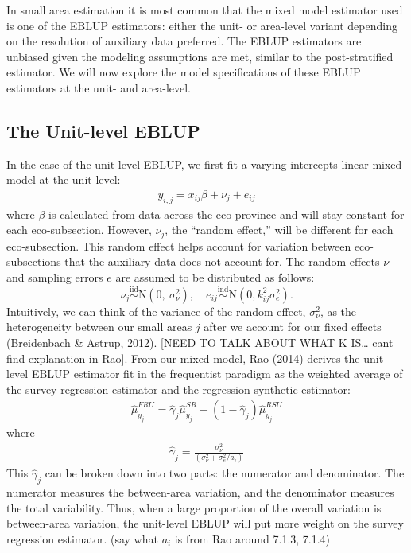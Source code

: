 \documentclass[12pt,twoside]{reedthesis}
\begin{document}
In small area estimation it is most common that the mixed model estimator used is one of the EBLUP estimators: either the unit- or area-level variant depending on the resolution of auxiliary data preferred. The EBLUP estimators are unbiased given the modeling assumptions are met, similar to the post-stratified estimator. We will now explore the model specifications of these EBLUP estimators at the unit- and area-level.

\hypertarget{the-unit-level-eblup}{%
\subsection{The Unit-level EBLUP}\label{the-unit-level-eblup}}

In the case of the unit-level EBLUP, we first fit a varying-intercepts linear mixed model at the unit-level:
\begin{align}
y_{i,j} = x_{ij} \beta + \nu_j + e_{ij} \label{eq:unit-mod}
\end{align}
where \(\beta\) is calculated from data across the eco-province and will stay constant for each eco-subsection. However, \(\nu_j\), the ``random effect,'' will be different for each eco-subsection. This random effect helps account for variation between eco-subsections that the auxiliary data does not account for. The random effects \(\nu\) and sampling errors \(e\) are assumed to be distributed as follows:
\[
 \newcommand\myeq{\stackrel{\mathclap{\normalfont\mbox{s}}}{~}}
\nu_j \stackrel{\text{iid}}{\sim} \text{N}(0,~ \sigma^2_{\nu}), \quad e_{ij} \stackrel{\text{ind}}{\sim}\text{N}(0, k^2_{ij}\sigma^2_e).
\]
Intuitively, we can think of the variance of the random effect, \(\sigma^2_\nu\), as the heterogeneity between our small areas \(j\) after we account for our fixed effects (Breidenbach \& Astrup, 2012). {[}NEED TO TALK ABOUT WHAT K IS\ldots{} cant find explanation in Rao{]}.
From our mixed model, Rao (2014) derives the unit-level EBLUP estimator fit in the frequentist paradigm as the weighted average of the survey regression estimator and the regression-synthetic estimator:
\begin{align}
\hat \mu_{y_j}^{FRU} = \hat \gamma_j \hat\mu_{y_j}^{SR} + (1 - \hat \gamma_j) \hat\mu_{y_j}^{RSU}
\end{align}
where
\begin{align}
\hat\gamma_j = \frac{\sigma^2_\nu}{(\sigma^2_\nu + \sigma^2_e / a_i)}
\end{align}
This \(\hat\gamma_j\) can be broken down into two parts: the numerator and denominator. The numerator measures the between-area variation, and the denominator measures the total variability. Thus, when a large proportion of the overall variation is between-area variation, the unit-level EBLUP will put more weight on the survey regression estimator.
(say what \(a_i\) is from Rao around 7.1.3, 7.1.4)
\end{document}
